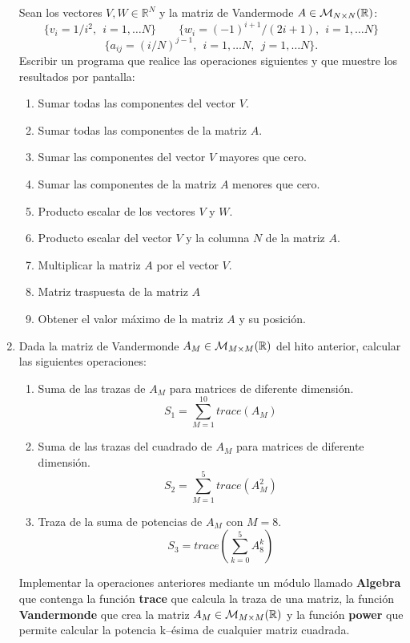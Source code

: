 \documentclass[12pt]{article}
\begin{document}
\begin{enumerate}
\noindent Sean los vectores $V, W \in \mathbb{R}^N$ y la matriz de Vandermode $A \in 
{\cal M}_{N \times N} (\mathbb{R})$: 
$$
\{ v_i =  1/i^2, \ \  i=1, \ldots N \} \qquad  \{  w_i = (-1)^{i+1}/(2i+1), \ \   i=1, \ldots N  \} 
$$
$$
\{ a_{ij} = (i/N)^{j-1}, \ \ i=1, \ldots N, \ \  j=1, \ldots N \}. 
$$
Escribir un programa que realice las operaciones siguientes y que muestre los
resultados por pantalla: 
\begin{enumerate}
	\item Sumar todas las componentes del vector $V$. 
	\item Sumar todas las componentes de la matriz $A$.   
	\item Sumar las componentes del vector $V$ mayores que cero.
	\item Sumar las componentes de la matriz $A$ menores que cero.   
	\item Producto escalar de los vectores $V$ y $W$.   
	\item Producto escalar del vector $V$ y la columna $N$ de la matriz $A$. 
	\item Multiplicar la matriz $A$ por el vector $V$.
	\item Matriz traspuesta de la matriz $A$   
	\item Obtener el valor máximo de la matriz $A$ y su posición.
\end{enumerate}


\item Dada la matriz  de Vandermonde $A_M \in {\cal M}_{M \times M} (\mathbb{R})$ del hito anterior,
calcular las siguientes operaciones: 

\begin{enumerate}	
	\item Suma de las trazas de $ A_M $ para matrices de diferente dimensión. 
	$$  S_1 = \sum_{M=1} ^{10} trace(A_M) $$ 
	\item  Suma de las trazas del cuadrado de $ A_M $ para matrices de diferente dimensión. 
	$$  S_2 = \sum_{M=1} ^{5} trace(A_M^2) $$ 
	\item Traza de la suma de potencias de $ A_M $  con $ M=8 $.
	$$  S_3 = trace \left( \sum_{k=0} ^{5} A_8^k  \right) $$
\end{enumerate}  
 
Implementar la operaciones anteriores mediante un módulo llamado \textbf{Algebra} 
que contenga la función  \textbf{trace} que calcula la traza de una matriz, la 
función  \textbf{Vandermonde} que crea la matriz  $ A_M \in { \cal M } _{ M 
\times M } ( \mathbb{R} )$ 
 y la función \textbf{power} que permite calcular la potencia k--ésima de 
 cualquier matriz cuadrada. 




\end{enumerate}
\end{document}
